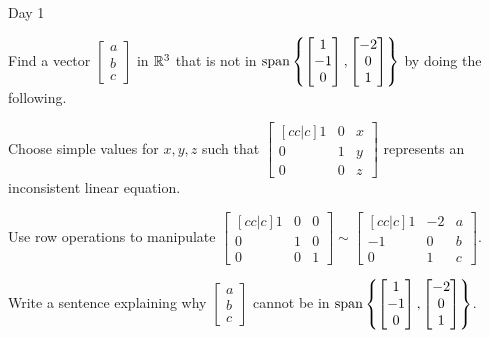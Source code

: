 \begin{applicationActivities}{Day 1}
\begin{activity}{15}
  Find a vector \(\begin{bmatrix}a\\b\\c\end{bmatrix}\)
  in \(\mathbb{R}^3\) that is not in
  \(\operatorname{span}\left\{\begin{bmatrix}1\\-1\\0\end{bmatrix},
  \begin{bmatrix}-2\\0\\1\end{bmatrix}\right\}\) by doing the following.
    \begin{subactivity}
      Choose simple values for \(x,y,z\) such that
      \(\begin{bmatrix}[cc|c]1&0&x\\0&1&y\\0&0&z\end{bmatrix}\)
      represents an inconsistent linear equation.
    \end{subactivity}
    \begin{subactivity}
      Use row operations to manipulate
      \(\begin{bmatrix}[cc|c]1&0&0\\0&1&0\\0&0&1\end{bmatrix}\sim
      \begin{bmatrix}[cc|c]1&-2&a\\-1&0&b\\0&1&c\end{bmatrix}\).
    \end{subactivity}
    \begin{subactivity}
      Write a sentence explaining why \(\begin{bmatrix}a\\b\\c\end{bmatrix}\)
      cannot be in \(\operatorname{span}\left\{\begin{bmatrix}1\\-1\\0\end{bmatrix},
      \begin{bmatrix}-2\\0\\1\end{bmatrix}\right\}\).
    \end{subactivity}
\end{activity}


\end{applicationActivities}
